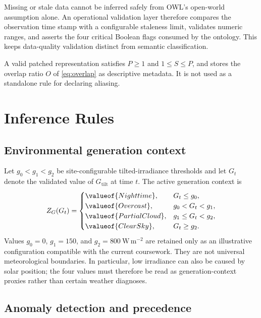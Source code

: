 Missing or stale data cannot be inferred safely from OWL's open-world assumption alone. An operational validation layer therefore compares the observation time stamp with a configurable staleness limit, validates numeric ranges, and asserts the four critical Boolean flags consumed by the ontology. This keeps data-quality validation distinct from semantic classification.



A valid patched representation satisfies $P\geq1$ and $1\leq S\leq P$, and stores the overlap ratio $O$ of \autoref{eq:overlap} as descriptive metadata. It is not used as a standalone rule for declaring aliasing.

\section{Inference Rules}

\subsection{Environmental generation context}

Let $g_0<g_1<g_2$ be site-configurable tilted-irradiance thresholds and let $G_t$ denote the validated value of $G_{\mathrm{tilt}}$ at time $t$. The active generation context is
\begin{equation}
\label{eq:generation-context}
Z_G(G_t)=
\begin{cases}
\valueof{Nighttime}, & G_t\leq g_0,\\
\valueof{Overcast}, & g_0<G_t<g_1,\\
\valueof{PartialCloud}, & g_1\leq G_t<g_2,\\
\valueof{ClearSky}, & G_t\geq g_2.
\end{cases}
\end{equation}
Values $g_0=0$, $g_1=150$, and $g_2=800\ \mathrm{W\,m^{-2}}$ are retained only as an illustrative configuration compatible with the current coursework. They are not universal meteorological boundaries. In particular, low irradiance can also be caused by solar position; the four values must therefore be read as generation-context proxies rather than certain weather diagnoses.

\subsection{Anomaly detection and precedence}

